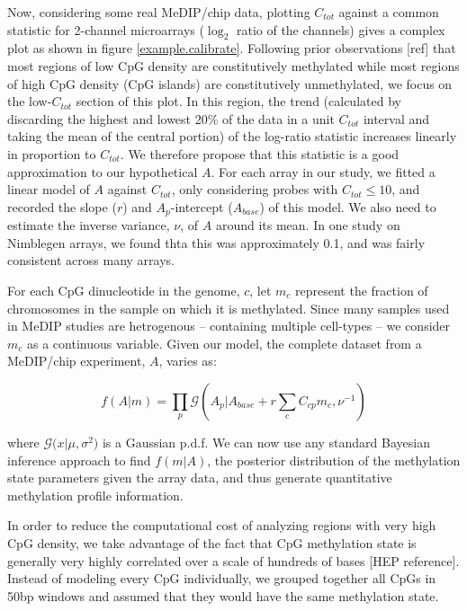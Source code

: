 \documentclass[a4paper, 11pt]{article}
\begin{document}
Now, considering some real MeDIP/chip data, plotting $C_{tot}$ against a
common statistic for 2-channel microarrays ($\log_2$ ratio of the
channels) gives a complex plot as shown in figure \ref{example.calibrate}.  Following prior
observations [ref] that most regions of low CpG density are
constitutively methylated while most regions of high CpG density (CpG
islands) are constitutively unmethylated, we focus on the low-$C_{tot}$
section of this plot.  In this region, the trend (calculated by
discarding the highest and lowest 20\% of the data in a unit $C_{tot}$ interval and
taking the mean of the central portion) of the log-ratio
statistic increases linearly in proportion to $C_{tot}$.  We therefore
propose that this statistic is a good approximation to our hypothetical
$A$.  For each array in our study, we fitted a linear model of $A$ against
$C_{tot}$, only considering probes with $C_{tot }\leq 10$, and recorded the
slope ($r$) and $A_p$-intercept ($A_{base}$) of this model. 
We also need to estimate
the inverse variance, $\nu$, of $A$ around its mean.  In one study on Nimblegen arrays, we found thta
this was approximately 0.1, and was fairly consistent across many arrays.

For each CpG dinucleotide in the genome, $c$, let $m_c$ represent the fraction
of chromosomes in the sample on which it is methylated.  Since many samples used in
MeDIP studies are hetrogenous -- containing multiple cell-types -- we consider $m_c$ as
a continuous variable.  Given our model, the complete dataset from a
MeDIP/chip experiment, $A$, varies as:

\begin{equation}
f(A | m) = \prod_p {\mathcal G}(A_p | A_{base} + r \sum_{c}{C_{cp}m_c}, \nu^{-1})
\end{equation}

where ${\mathcal G(x | \mu, \sigma^2})$ is a Gaussian p.d.f.
We can now use any standard Bayesian inference approach to find $f(m |A)$,
the posterior distribution of the methylation state parameters
given the array data, and thus generate quantitative methylation
profile information.

In order to reduce the computational cost of analyzing regions with very high
CpG density, we take advantage of the fact that CpG methylation state is
generally very highly correlated over a scale of hundreds of bases [HEP
reference].  Instead of modeling every CpG individually, we grouped together
all CpGs in 50bp windows and assumed that they would have the same methylation
state.
\end{document}
